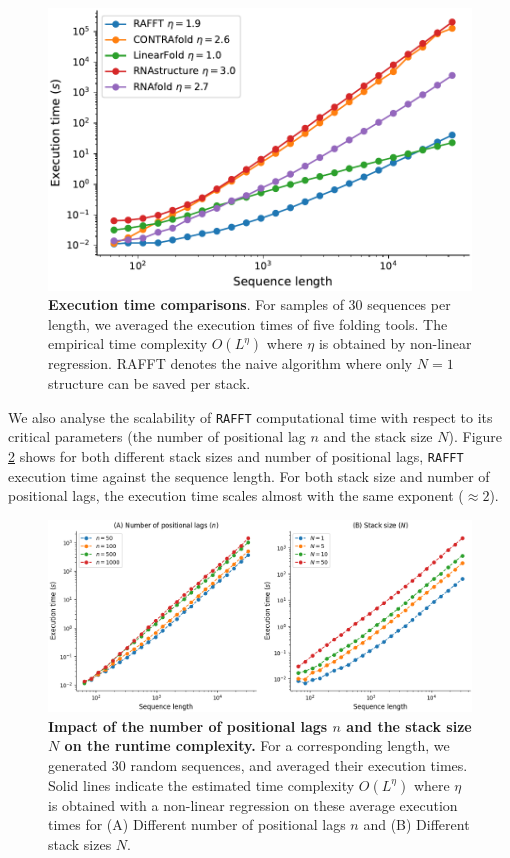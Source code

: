 \begin{figure}[H]
	\centering
	\includegraphics[width=1.0\linewidth]{../res/images/rafft/All_CPU_time.pdf}
	\caption{\label{Fig:time_comp}\textbf{Execution time comparisons}. For samples of
		$30$ sequences per length, we averaged the execution times of five folding
		tools. The empirical time complexity $O(L^\eta)$ where $\eta$ is obtained by
		non-linear regression. RAFFT denotes the naive algorithm where only $N=1$ structure can be saved per stack.}
\end{figure}

We also analyse the scalability of \texttt{RAFFT} computational time with respect to its critical parameters (the number  of positional lag $n$ and the stack size $N$).  Figure \ref{Fig:scalability} shows for both different stack sizes and number of positional lags, \texttt{RAFFT} execution time against the sequence length. For both stack size and number of positional lags, the execution time scales almost with the same exponent ($\approx 2$).

\begin{figure}[h]
	\centering
	\includegraphics[width=1.0\linewidth]{../res/images/rafft/CPU_time.png}
	\caption{\label{Fig:scalability}\textbf{Impact of the number of positional lags $n$ and the stack size $N$
			on the runtime complexity.} For a corresponding length, we generated $30$
		random sequences, and averaged their execution times. Solid lines indicate
		the estimated time complexity $O(L^\eta)$ where $\eta$ is obtained with a
		non-linear regression on these average execution times for (A) Different number
		of positional lags $n$ and (B) Different stack sizes $N$.}
\end{figure} 

